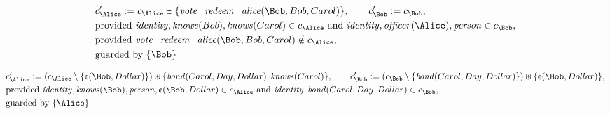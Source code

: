 \begin{align*}
&
c'_
{
\Alice
}
 := 
c_
{
\Alice
}
 \uplus 
\{
\mathit{\detokenize{
vote_redeem_alice
}}
(
\Bob
,
Bob
,
Carol
)
\}
, \qquad 
c'_
{
\Bob
}
 := 
c_
{
\Bob
}
,\\
&
\text{provided } 
\mathit{\detokenize{
identity
}}
,
\mathit{\detokenize{
knows
}}
(
Bob
)
,
\mathit{\detokenize{
knows
}}
(
Carol
)
 \in c_
{
\Alice
}
 \text{ and } 
\mathit{\detokenize{
identity
}}
,
\mathit{\detokenize{
officer
}}
(
\Alice
)
,
\mathit{\detokenize{
person
}}
 \in c_
{
\Bob
}
,\\
&
\text{provided } 
\mathit{\detokenize{
vote_redeem_alice
}}
(
\Bob
,
Bob
,
Carol
)
 \notin c_
{
\Alice
}
,\\
&
\text{guarded by } \{
\Bob
\}
\end{align*}

\begin{align*}
&
c'_
{
\Alice
}
 := 
(c_
{
\Alice
}
 \setminus 
\{
\text{\textcent}
(
\Bob
,
Dollar
)
\}
) \uplus 
\{
\mathit{\detokenize{
bond
}}
(
Carol
,
Day
,
Dollar
)
,
\mathit{\detokenize{
knows
}}
(
Carol
)
\}
, \qquad 
c'_
{
\Bob
}
 := 
(c_
{
\Bob
}
 \setminus 
\{
\mathit{\detokenize{
bond
}}
(
Carol
,
Day
,
Dollar
)
\}
) \uplus 
\{
\text{\textcent}
(
\Bob
,
Dollar
)
\}
,\\
&
\text{provided } 
\mathit{\detokenize{
identity
}}
,
\mathit{\detokenize{
knows
}}
(
\Bob
)
,
\mathit{\detokenize{
person
}}
,
\text{\textcent}
(
\Bob
,
Dollar
)
 \in c_
{
\Alice
}
 \text{ and } 
\mathit{\detokenize{
identity
}}
,
\mathit{\detokenize{
bond
}}
(
Carol
,
Day
,
Dollar
)
 \in c_
{
\Bob
}
,\\
&
\text{guarded by } \{
\Alice
\}
\end{align*}

